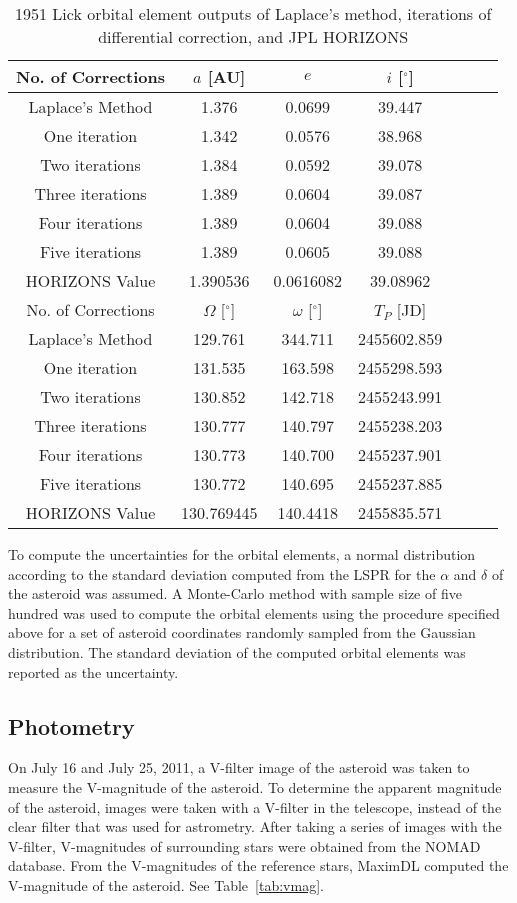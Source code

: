 \documentclass[12pt,journal,compsoc]{IEEEtran}
\begin{document}
\begin{table}[!t]
\centering
\begin{tabular}{|c|c|c|c|c|c|c|}
\hline
No. of Corrections & $a$ [AU]& $e$ & $i$ [$^\circ$] \\ \hline
Laplace's Method &1.376& 0.0699& 39.447 \\ \hline
One iteration &1.342& 0.0576& 38.968 \\ \hline
Two iterations &1.384& 0.0592& 39.078 \\ \hline
Three iterations &1.389& 0.0604& 39.087 \\ \hline
Four iterations &1.389& 0.0604& 39.088 \\ \hline
Five iterations &1.389& 0.0605& 39.088 \\ \hline
HORIZONS Value & 1.390536 & 0.0616082& 39.08962  \\ \hline \hline
No. of Corrections & $\Omega$ [$^\circ$] & $\omega$ [$^\circ$] & $T_P$ [JD]\\ \hline
Laplace's Method & 129.761& 344.711& 2455602.859\\ \hline
One iteration & 131.535& 163.598& 2455298.593\\ \hline
Two iterations & 130.852& 142.718& 2455243.991\\ \hline
Three iterations & 130.777& 140.797& 2455238.203\\ \hline
Four iterations & 130.773& 140.700& 2455237.901\\ \hline
Five iterations & 130.772& 140.695& 2455237.885\\ \hline 
HORIZONS Value & 130.769445 & 140.4418 & 2455835.571 \\ \hline
\end{tabular}
\caption{\label{tab:iterations} 1951 Lick orbital element outputs of Laplace's method, iterations of differential correction, and JPL HORIZONS}
\end{table}

To compute the uncertainties for the orbital elements, 
a normal distribution according to the standard deviation computed from the LSPR 
for the $\alpha$ and $\delta$ of the asteroid was assumed.
A Monte-Carlo method with sample size of five hundred was used to compute the orbital elements using the procedure 
specified above for a set of asteroid coordinates randomly sampled from the Gaussian distribution.
The standard deviation of the computed orbital elements was reported as the uncertainty.

\subsection{Photometry}
On July 16 and July 25, 2011, a V-filter image of the asteroid was taken to measure the V-magnitude of the asteroid.
To determine the apparent magnitude of the asteroid, images were taken with a V-filter in the telescope, 
instead of the clear filter that was used for astrometry.
After taking a series of images with the V-filter, V-magnitudes of surrounding stars were obtained from the NOMAD database.
From the V-magnitudes of the reference stars, MaximDL computed the V-magnitude of the asteroid. See Table~\ref{tab:vmag}.
\end{document}
